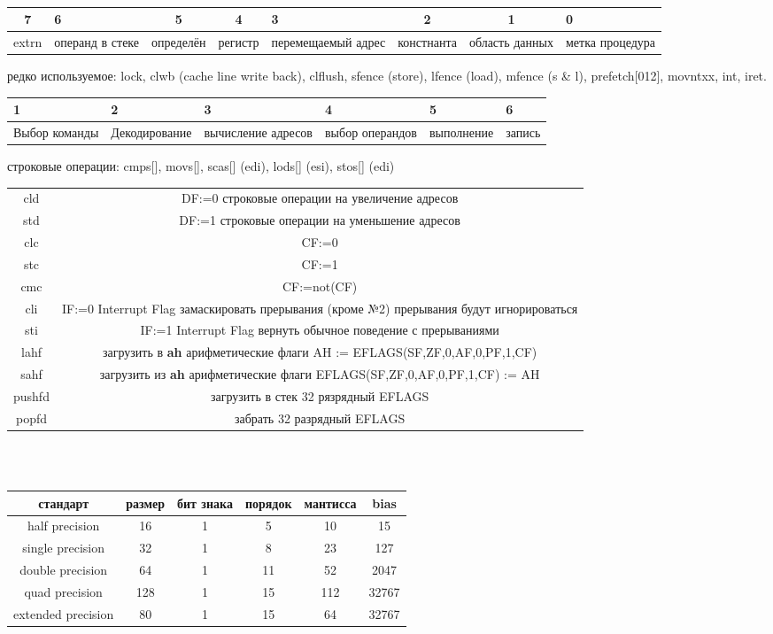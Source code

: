 \documentclass[a4paper,10pt]{article}
\begin{document}
\\
\begin{tabularx}{\textwidth}{|c|X|c|c|X|c|c|X|}
\hline
7&6&5&4&3&2&1&0 \\
\hline
extrn&операнд в стеке&определён&регистр&перемещаемый адрес&констнанта&область данных&метка процедура \\
\hline
\end{tabularx}
редко используемое: lock, clwb (cache line write back), clflush, sfence (store), lfence (load), mfence (s \& l), prefetch[012], movntxx, int, iret. \\
\begin{tabularx}{\textwidth}{|X|X|X|X|X|X|}
    \hline
    1&2&3&4&5&6 \\
    \hline
    Выбор команды&Декодирование&вычисление адресов&выбор операндов&выполнение&запись \\
    \hline
\end{tabularx}
строковые операции: cmps[], movs[], scas[] (edi), lods[] (esi), stos[] (edi) \\
\begin{tabular}{|c|c|}
    \hline
    cld & DF:=0 строковые операции на увеличение адресов \\
    std & DF:=1 строковые операции на уменьшение адресов \\
    clc & CF:=0 \\
    stc & CF:=1 \\
    cmc & CF:=not(CF) \\
    cli & IF:=0 Interrupt Flag замаскировать прерывания (кроме №2) прерывания будут игнорироваться \\
    sti & IF:=1 Interrupt Flag вернуть обычное поведение с прерываниями \\
    lahf & загрузить в \textbf{ah} арифметические флаги AH := EFLAGS(SF,ZF,0,AF,0,PF,1,CF)\\
    sahf & загрузить из \textbf{ah} арифметические флаги EFLAGS(SF,ZF,0,AF,0,PF,1,CF) := AH\\
    pushfd & загрузить в стек 32 рязрядный EFLAGS \\
    popfd & забрать 32 разрядный EFLAGS \\
    \hline
\end{tabular}\\ \\
\begin{tabular}{|c|c|c|c|c|c|}
    \hline
    стандарт& размер & бит знака & порядок & мантисса & bias \\
    \hline
    half precision & 16 & 1 & 5 & 10& 15\\
    \hline
    single precision & 32 & 1 & 8 & 23 & 127\\
    \hline
    double precision & 64 & 1 & 11 & 52 & 2047\\
    \hline
    quad precision &128 & 1 & 15 & 112 & 32767 \\
    \hline
    extended precision &80& 1 & 15 & 64 & 32767 \\
    \hline
\end{tabular}
\end{document}
